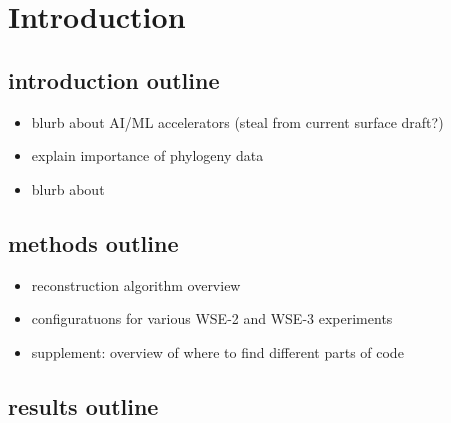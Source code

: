 \section{Introduction} \label{sec:introduction}

\subsection{introduction outline}

\begin{itemize}
\item blurb about AI/ML accelerators (steal from current surface draft?)
\item explain importance of phylogeny data
\item blurb about
\end{itemize}

\subsection{methods outline}

\begin{itemize}
\item reconstruction algorithm overview
\item configuratuons for various WSE-2 and WSE-3 experiments
\item supplement: overview of where to find different parts of code
\end{itemize}

\subsection{results outline}

